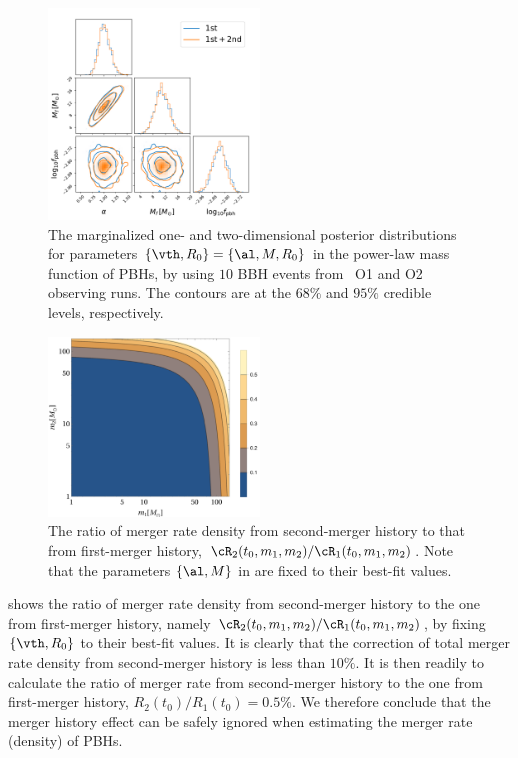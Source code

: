 \documentclass[
reprint,           %
superscriptaddress,%
amsmath,           %
amssymb,           %
aps,               %
prd,               %
notitlepage,       %
longbibliography,  %
floatfix,          %
showkeys,          %
]{revtex4-1}
\begin{document}
\begin{figure}[htbp!]
	\centering
	\includegraphics[width=0.5\textwidth]{post-CC.pdf}
	\caption{\label{post-CC}
		The marginalized one- and two-dimensional posterior distributions for 
		parameters $\{\vth, R_0\} = \{\al, M, R_0\}$ in the power-law mass function 
		of PBHs, by using $10$ BBH events from \lvc\ O1 and O2 observing runs.
		The contours are at the $68\%$ and $95\%$ credible levels, respectively. 
	}
\end{figure}

\begin{figure}[htbp!]
	\centering
	\includegraphics[width=0.5\textwidth]{ratio-CC.pdf}
	\caption{\label{ratio-CC}
		The ratio of merger rate density from second-merger history
		to that from first-merger history,
		$\cR_2(t_0, m_1, m_2)/\cR_1(t_0, m_1, m_2)$. Note that the parameters $\{\al, M\}$ in  are fixed to their best-fit values.
	}
\end{figure}

 shows the ratio of merger rate density from second-merger history
to the one from first-merger history, namely 
$\cR_2(t_0, m_1, m_2)/\cR_1(t_0, m_1, m_2)$, by fixing $\{\vth, R_0\}$ to their best-fit values.
It is clearly that the correction of total merger rate density from 
second-merger history is less than $10\%$.
It is then readily to calculate the ratio of merger rate from 
second-merger history to the one from first-merger history, 
$R_2(t_0)/R_1(t_0) = 0.5\%$.
We therefore conclude that the merger history effect can be safely ignored
when estimating the merger rate (density) of PBHs.
\end{document}
